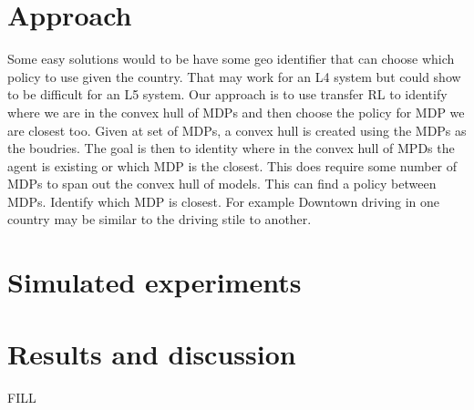 \section{Approach}
Some easy solutions would to be have some geo identifier that can choose which policy to use given the country. That may work for an L4 system but could show to be difficult for an L5 system. Our approach is to use transfer RL to identify where we are in the convex hull of MDPs and then choose the policy for MDP we are closest too. 
Given at set of MDPs, a convex hull is created using the MDPs as the boudries. The goal is then to identity where in the convex hull of MPDs the agent is existing or which MDP is the closest. 
This does require some number of MDPs to span out the convex hull of models. 
This can find a policy between MDPs. 
Identify which MDP is closest. For example Downtown driving in one country may be similar to the driving stile to another. 


\section{Simulated experiments}
\section{Results and discussion}
FILL